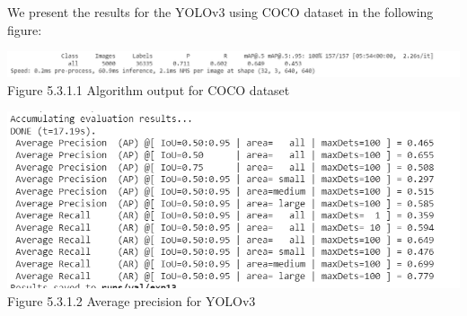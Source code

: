 \documentclass[runningheads,a4paper,11pt]{report}
\begin{document}
We present the results for the YOLOv3 using COCO dataset in the following figure:
\begin{center}
\includegraphics[width=16cm]{images/speed_yolo.PNG}   
Figure 5.3.1.1 Algorithm output for COCO dataset
\end{center}
\begin{center}
\includegraphics[width=16cm]{images/average precision yolo.PNG} 
Figure 5.3.1.2 Average precision for YOLOv3
\end{center}
\end{document}
